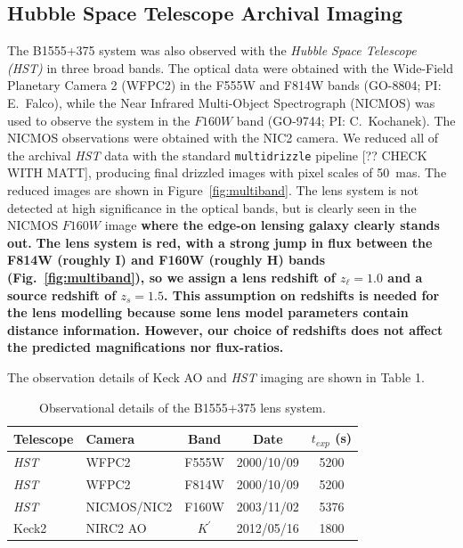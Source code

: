 \documentclass[useAMS,usenatbib]{mn2e}
\begin{document}
\subsection{Hubble Space Telescope Archival Imaging}

The B1555+375 system was also observed with the \textit{Hubble Space Telescope
(\textit{HST})} in three broad bands.  The optical data were obtained with the
Wide-Field Planetary Camera 2 (WFPC2) in the F555W and F814W bands
(GO-8804; PI: E.\ Falco), while the Near Infrared Multi-Object
Spectrograph (NICMOS) was used to observe the system in the $F160W$
band (GO-9744; PI: C.\ Kochanek).  The NICMOS observations were
obtained with the NIC2 camera.  We reduced all of the archival \textit{HST}
data with the standard {\tt multidrizzle} pipeline [?? CHECK WITH
  MATT], producing final drizzled images with pixel scales of 50~mas.
The reduced images are shown in Figure~\ref{fig:multiband}.  The lens
system is not detected at high significance in the optical bands, but
is clearly seen in the NICMOS $F160W$ image \textbf{where the edge-on lensing
galaxy clearly stands out.}
\textbf{The lens system is red, with a strong jump in flux between the F814W
(roughly I) and F160W (roughly H) bands (Fig.~\ref{fig:multiband}), so 
we assign a lens redshift of $z_\ell = 1.0$ and a source redshift of
$z_s =1.5$. This assumption on redshifts is needed for the lens modelling because some lens model parameters contain distance information. However, our choice of redshifts does not affect the predicted magnifications nor flux-ratios.} 

The observation details of Keck AO and \textit{HST} imaging are shown in Table 1.

\begin{table}
 \centering
  \caption{Observational details of the B1555+375 lens system.}
  \begin{tabular}{@{}llccc}
  
\hline
  Telescope     &      Camera     &  Band & Date &$t_{exp}$ (s) \\

 \hline
   \textit{HST}				&		WFPC2    &  F555W		&	2000/10/09 	&	5200\\
   \textit{HST}				&		WFPC2    &  F814W		&	2000/10/09 &	5200\\
   \textit{HST}				&		NICMOS/NIC2	&	F160W	&	2003/11/02 & 5376\\
   Keck2			&		NIRC2 AO	&   $K^\prime$	& 2012/05/16	&  1800\\
   \hline
\end{tabular}
\end{table}
\end{document}
